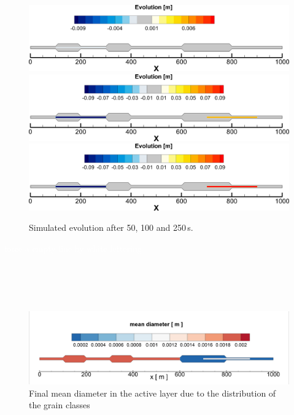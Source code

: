 \begin{figure} [!h]
 \centering
 \includegraphics[scale=0.15]{img/result50.png}
 \includegraphics[scale=0.15]{img/result150.png}
 \includegraphics[scale=0.15]{img/result250.png}
 \caption{Simulated evolution after 50, 100 and 250\,s.}\label{E1result50}
\end{figure}
\textcolor{white}{force a empty line by white lettering} \\    %
\\
\\
\\
\\
\begin{figure} [!h]
 \centering
 \includegraphics[scale=0.175]{img/final_grainsize.png}
 \caption{Final mean diameter in the active layer due to the distribution of the grain classes }\label{E1endDm}
\end{figure}
